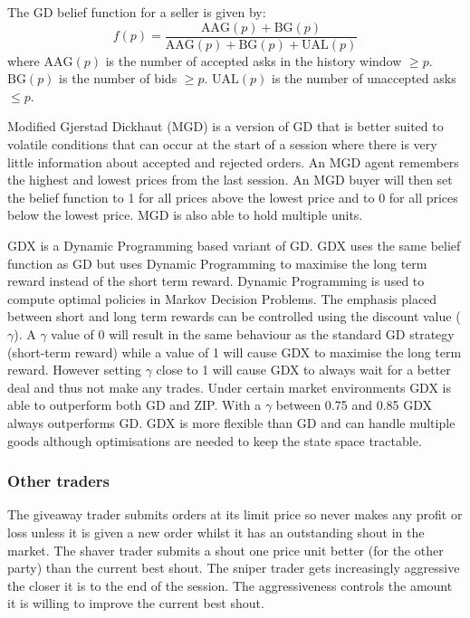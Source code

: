 \documentclass[preprint]{acm_proc_article-sp} %
\begin{document}
The GD belief function for a seller is given by:
\begin{equation}
  f(p) = \frac{\text{AAG}(p) + \text{BG}(p)}{\text{AAG}(p) + \text{BG}(p) +
  \text{UAL}(p)}
\end{equation}
where $\text{AAG}(p)$ is the number of accepted asks in the history window $\geq p$.
$\text{BG}(p)$ is the number of bids $\geq p$. $\text{UAL}(p)$ is the number of unaccepted asks $\leq p$.

Modified Gjerstad Dickhaut (MGD) \cite{mgd} is a version of GD that
is better suited to volatile conditions that can occur at the start of a
session where there is very little information about accepted and rejected
orders.
An MGD agent remembers the highest and lowest prices from the last session.
An MGD buyer will then set the belief function to 1 for all prices above the
lowest price and to 0 for all prices below the lowest price.
MGD is also able to hold multiple units.

GDX \cite{gdx} is a Dynamic Programming based variant of GD.
GDX uses the same belief function as GD but uses Dynamic Programming to
maximise the long term reward instead of the short term reward.
Dynamic Programming is used to compute optimal policies in Markov Decision
Problems.
The emphasis placed between short and long term rewards can be controlled using
the discount value ($\gamma$).
A $\gamma$ value of 0 will result in the same behaviour as the standard GD strategy
(short-term reward) while a value of 1 will cause GDX to maximise the long term
reward.
However setting $\gamma$ close to 1 will cause GDX to always wait for a better
deal and thus not make any trades.
Under certain market environments GDX is able to outperform
both GD and ZIP.
With a $\gamma$ between 0.75 and 0.85 GDX always outperforms GD.
GDX is more flexible than GD and can handle multiple goods although
optimisations are needed to keep the state space tractable.\\



\subsubsection{Other traders}
The giveaway trader submits orders at its limit price so never makes any profit
or loss unless it is given a new order whilst it has an outstanding shout in
the market. The shaver trader submits a shout one price unit better (for the
other party) than the current best shout. The sniper trader gets increasingly
aggressive the closer it is to the end of the session. The aggressiveness
controls the amount it is willing to improve the current best shout.\\
\end{document}
